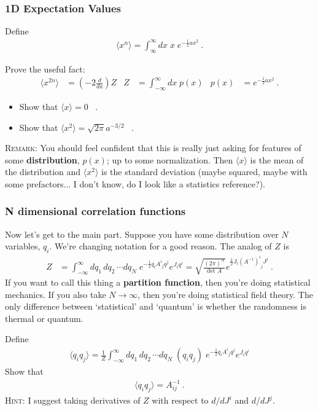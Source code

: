 \documentclass[12pt]{article}
\begin{document}
\subsubsection{1D Expectation Values}

Define
\begin{align}
	\langle x^n \rangle = \int_{\infty}^\infty dx \; x \; e^{-\frac 12 ax^2} \ .
\end{align}

Prove the useful fact:
\begin{align}
	\langle x^{2n} \rangle &= \left(-2\frac{d}{da}\right) Z
	& 
	Z &= \int_{-\infty}^\infty dx\; p(x) 
	&
	p(x) &=  e^{-\frac 12 ax^2}\ .
\end{align}


\begin{itemize}
	\item Show that $\langle x\rangle = 0$ \ .
	\item Show that $\langle x^2\rangle = \sqrt{2\pi} a^{-3/2}$ \ .
\end{itemize}

\textsc{Remark}: You should feel confident that this is really just asking for features of some \textbf{distribution}, $p(x)$; up to some normalization. Then $\langle x \rangle$ is the mean of the distribution and $\langle x^2 \rangle$ is the standard deviation (maybe squared, maybe with some prefactors... I don't know, do I look like a statistics reference?).  

\subsubsection{N dimensional correlation functions}

Now let's get to the main part. Suppose you have some distribution over $N$ variables, $q_i$. We're changing notation for a good reason. The analog of $Z$ is
\begin{align}
	Z & = \int_{-\infty}^\infty dq_1\, dq_2\, \cdots dq_N \;
	e^{-\frac 12 q_i A^i_{\phantom{i}j} q^j}
	e^{J_i q^i}
	= 
	\sqrt{\frac{(2\pi)^N}{\text{det }A}} e^{\frac 12 J_i (A^{-1})^i_{\phantom{i}j} J^j} \ .
\end{align}
If you want to call this thing a \textbf{partition function}, then you're doing statistical mechanics. If you also take $N\to \infty$, then you're doing statistical field theory. The only difference between `statistical' and `quantum' is whether the randomness is thermal or quantum.

Define
\begin{align}
	\langle q_i q_j \rangle = \frac{1}{Z}  
	\int_{-\infty}^\infty dq_1\, dq_2\, \cdots dq_N \;
	\left(q_i q_j\right)
	\;
	e^{-\frac 12 q_i A^i_{\phantom{i}j} q^j}
	e^{J_i q^i}
\end{align}
Show that
\begin{align}
	\langle q_i q_j \rangle = A^{-1}_{ij} \ .
\end{align}
\textsc{Hint}: I suggest taking derivatives of $Z$ with respect to $d/dJ^i$ and $d/dJ^j$. 
\end{document}
